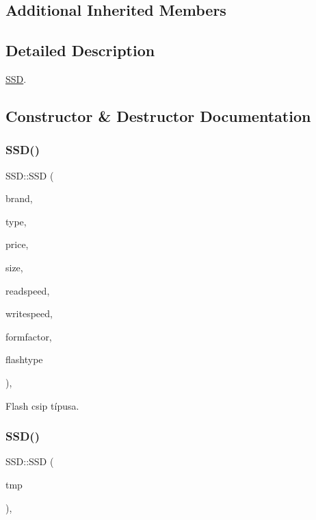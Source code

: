 \subsection*{Additional Inherited Members}


\subsection{Detailed Description}
\mbox{\hyperlink{class_s_s_d}{S\+SD}}. 

\subsection{Constructor \& Destructor Documentation}
\mbox{\label{class_s_s_d_a1e80104276b02f8ca6f016f41a2a5f41}} 
\subsubsection{\texorpdfstring{SSD()}{SSD()}\hspace{0.1cm}{\footnotesize\ttfamily [1/2]}}
{\footnotesize\ttfamily S\+S\+D\+::\+S\+SD (\begin{DoxyParamCaption}\item[{\mbox{\hyperlink{class_string}{String}}}]{brand,  }\item[{\mbox{\hyperlink{class_string}{String}}}]{type,  }\item[{int}]{price,  }\item[{int}]{size,  }\item[{int}]{readspeed,  }\item[{int}]{writespeed,  }\item[{\mbox{\hyperlink{class_string}{String}}}]{formfactor,  }\item[{\mbox{\hyperlink{class_string}{String}}}]{flashtype }\end{DoxyParamCaption})\hspace{0.3cm}{\ttfamily [inline]}, {\ttfamily [explicit]}}



Flash csip típusa. 

\mbox{\label{class_s_s_d_a39a5322942a5320a9a2be8ac7cb4c596}} 
\subsubsection{\texorpdfstring{SSD()}{SSD()}\hspace{0.1cm}{\footnotesize\ttfamily [2/2]}}
{\footnotesize\ttfamily S\+S\+D\+::\+S\+SD (\begin{DoxyParamCaption}\item[{\mbox{\hyperlink{struct_temp_input}{Temp\+Input}}}]{tmp }\end{DoxyParamCaption})\hspace{0.3cm}{\ttfamily [inline]}, {\ttfamily [explicit]}}



